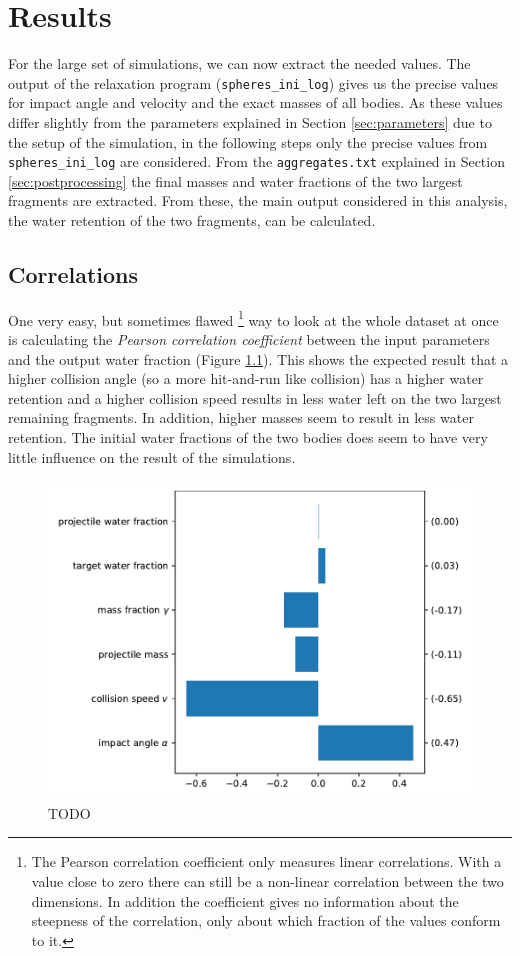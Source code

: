 \chapter{Results}
\label{chapter:results}

For the large set of simulations, we can now extract the needed values. The output of the relaxation program (\texttt{spheres\_ini\_log}) gives us the precise values for impact angle and velocity and the exact masses of all bodies. As these values differ slightly from the parameters explained in Section \ref{sec:parameters} due to the setup of the simulation, in the following steps only the precise values from \texttt{spheres\_ini\_log} are considered. From the \texttt{aggregates.txt} explained in Section \ref{sec:postprocessing} the final masses and water fractions of the two largest fragments are extracted. From these, the main output considered in this analysis, the water retention of the two fragments, can be calculated. 

\section{Correlations}
\label{sec:cov}
One very easy, but sometimes flawed%
\footnote{The Pearson correlation coefficient only measures linear correlations. With a value close to zero there can still be a non-linear correlation between the two dimensions. In addition the coefficient gives no information about the steepness of the correlation, only about which fraction of the values conform to it.} 
way to look at the whole dataset at once is calculating the \textit{Pearson correlation coefficient} between the input parameters and the output water fraction (Figure \ref{fig:cov}). This shows the expected result that a higher collision angle (so a more hit-and-run like collision) has a higher water retention and a higher collision speed results in less water left on the two largest remaining fragments. In addition, higher masses seem to result in less water retention. The initial water fractions of the two bodies does seem to have very little influence on the result of the simulations.

\begin{figure}[h]
	\centering
	\includegraphics[width=0.6\linewidth]{images/cov.pdf}
	\caption{TODO}
	\label{fig:cov}
\end{figure}